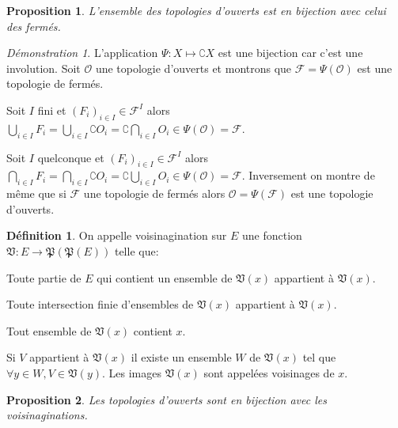 \documentclass[a4paper, 11pt, french]{book}
\newenvironment{itemise}{\itemize}{\enditemize}
\theoremstyle{plain} %
\newtheorem{proposition}{Proposition}
\theoremstyle{definition} %
\newtheorem{definition}{Définition}
\theoremstyle{remark} %
\newtheorem*{demonstration}{Démonstration}
\newcommand{\1}{\mathds{1}}
\begin{document}
\begin{proposition}
	L'ensemble des topologies d'ouverts est en bijection avec celui des fermés.
\end{proposition}

\begin{demonstration}
	L'application $\Psi:X\longmapsto\complement X$ est une bijection car c'est une involution.
	Soit $\mathscr{O}$ une topologie d'ouverts et montrons que $\mathscr{F}=\Psi(\mathscr{O})$ est une topologie de fermés.
	\begin{itemise}
		\item Soit $I$ fini et $(F_i)_{i\in I}\in\mathscr{F}^I$ alors $\bigcup_{i\in I}F_i=\bigcup_{i\in I}\complement O_i=\complement\bigcap_{i\in I}O_i\in\Psi(\mathscr{O})=\mathscr{F}$.
		\item Soit $I$ quelconque et $(F_i)_{i\in I}\in\mathscr{F}^I$ alors $\bigcap_{i\in I}F_i=\bigcap_{i\in I}\complement O_i=\complement\bigcup_{i\in I}O_i\in\Psi(\mathscr{O})=\mathscr{F}$.
	\end{itemise}
	Inversement on  montre de même que si $\mathscr{F}$ une topologie de fermés alors $\mathscr{O}=\Psi(\mathscr{F})$ est une topologie d'ouverts.
\end{demonstration}

\begin{definition}
	On appelle voisinagination sur $E$ une fonction $\mathfrak{V}:E\rightarrow\mathfrak{P}(\mathfrak{P}(E))$ telle que:
	\begin{itemise}
		\item Toute partie de $E$ qui contient un ensemble de $\mathfrak{V}(x)$ appartient à $\mathfrak{V}(x)$.
		\item Toute intersection finie d'ensembles de $\mathfrak{V}(x)$ appartient à $\mathfrak{V}(x)$.
		\item Tout ensemble de $\mathfrak{V}(x)$ contient $x$.
		\item Si $V$ appartient à $\mathfrak{V}(x)$ il existe un ensemble $W$ de $\mathfrak{V}(x)$ tel que $\forall y\in W, V\in\mathfrak{V}(y)$.
	\end{itemise}
	Les images $\mathfrak{V}(x)$ sont appelées voisinages de $x$.
\end{definition}

\begin{proposition}
	Les topologies d'ouverts sont en bijection avec les voisinaginations.
\end{proposition}
\end{document}
